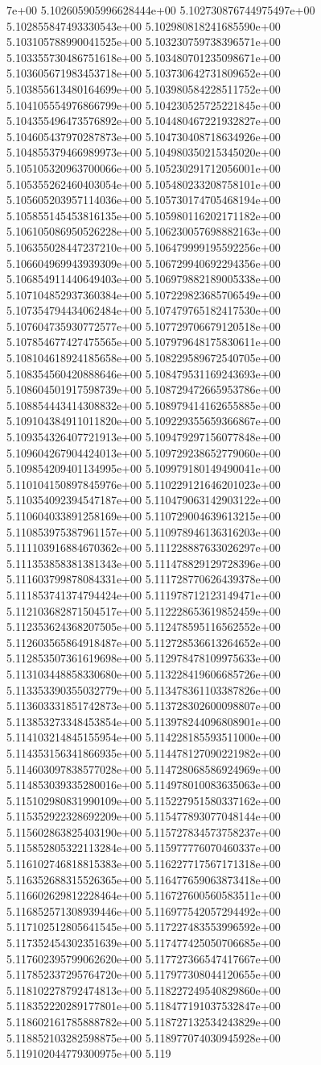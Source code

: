 7e+00	5.102605905996628444e+00	5.102730876744975497e+00	5.102855847493330543e+00	5.102980818241685590e+00	5.103105788990041525e+00	5.103230759738396571e+00	5.103355730486751618e+00	5.103480701235098671e+00	5.103605671983453718e+00	5.103730642731809652e+00	5.103855613480164699e+00	5.103980584228511752e+00	5.104105554976866799e+00	5.104230525725221845e+00	5.104355496473576892e+00	5.104480467221932827e+00	5.104605437970287873e+00	5.104730408718634926e+00	5.104855379466989973e+00	5.104980350215345020e+00	5.105105320963700066e+00	5.105230291712056001e+00	5.105355262460403054e+00	5.105480233208758101e+00	5.105605203957114036e+00	5.105730174705468194e+00	5.105855145453816135e+00	5.105980116202171182e+00	5.106105086950526228e+00	5.106230057698882163e+00	5.106355028447237210e+00	5.106479999195592256e+00	5.106604969943939309e+00	5.106729940692294356e+00	5.106854911440649403e+00	5.106979882189005338e+00	5.107104852937360384e+00	5.107229823685706549e+00	5.107354794434062484e+00	5.107479765182417530e+00	5.107604735930772577e+00	5.107729706679120518e+00	5.107854677427475565e+00	5.107979648175830611e+00	5.108104618924185658e+00	5.108229589672540705e+00	5.108354560420888646e+00	5.108479531169243693e+00	5.108604501917598739e+00	5.108729472665953786e+00	5.108854443414308832e+00	5.108979414162655885e+00	5.109104384911011820e+00	5.109229355659366867e+00	5.109354326407721913e+00	5.109479297156077848e+00	5.109604267904424013e+00	5.109729238652779060e+00	5.109854209401134995e+00	5.109979180149490041e+00	5.110104150897845976e+00	5.110229121646201023e+00	5.110354092394547187e+00	5.110479063142903122e+00	5.110604033891258169e+00	5.110729004639613215e+00	5.110853975387961157e+00	5.110978946136316203e+00	5.111103916884670362e+00	5.111228887633026297e+00	5.111353858381381343e+00	5.111478829129728396e+00	5.111603799878084331e+00	5.111728770626439378e+00	5.111853741374794424e+00	5.111978712123149471e+00	5.112103682871504517e+00	5.112228653619852459e+00	5.112353624368207505e+00	5.112478595116562552e+00	5.112603565864918487e+00	5.112728536613264652e+00	5.112853507361619698e+00	5.112978478109975633e+00	5.113103448858330680e+00	5.113228419606685726e+00	5.113353390355032779e+00	5.113478361103387826e+00	5.113603331851742873e+00	5.113728302600098807e+00	5.113853273348453854e+00	5.113978244096808901e+00	5.114103214845155954e+00	5.114228185593511000e+00	5.114353156341866935e+00	5.114478127090221982e+00	5.114603097838577028e+00	5.114728068586924969e+00	5.114853039335280016e+00	5.114978010083635063e+00	5.115102980831990109e+00	5.115227951580337162e+00	5.115352922328692209e+00	5.115477893077048144e+00	5.115602863825403190e+00	5.115727834573758237e+00	5.115852805322113284e+00	5.115977776070460337e+00	5.116102746818815383e+00	5.116227717567171318e+00	5.116352688315526365e+00	5.116477659063873418e+00	5.116602629812228464e+00	5.116727600560583511e+00	5.116852571308939446e+00	5.116977542057294492e+00	5.117102512805641545e+00	5.117227483553996592e+00	5.117352454302351639e+00	5.117477425050706685e+00	5.117602395799062620e+00	5.117727366547417667e+00	5.117852337295764720e+00	5.117977308044120655e+00	5.118102278792474813e+00	5.118227249540829860e+00	5.118352220289177801e+00	5.118477191037532847e+00	5.118602161785888782e+00	5.118727132534243829e+00	5.118852103282598875e+00	5.118977074030945928e+00	5.119102044779300975e+00	5.119